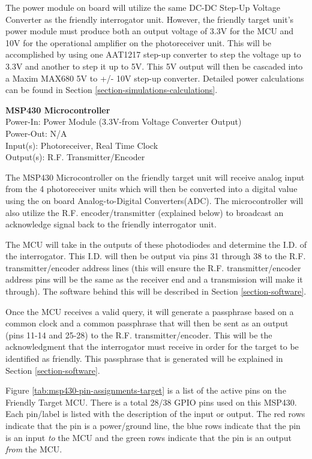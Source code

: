 \documentclass[letterpaper,10pt]{article}
\begin{document}
\begin{spacing}{1.15}
The power module on board will utilize the same DC-DC Step-Up Voltage Converter as the friendly interrogator unit. However, the friendly target unit's power module must produce both an output voltage of 3.3V for the MCU and 10V for the operational amplifier on the photoreceiver unit. This will be accomplished by using one AAT1217 step-up converter to step the voltage up to 3.3V and another to step it up to 5V. This 5V output will then be cascaded into a Maxim MAX680 5V to +/- 10V step-up converter. Detailed power calculations can be found in Section \ref{section-simulations-calculations}.

\normalsize\textbf{MSP430 Microcontroller} \\
Power-In: Power Module (3.3V-from Voltage Converter Output)\\
Power-Out: N/A \\
Input(s): Photoreceiver, Real Time Clock\\
Output(s): R.F. Transmitter/Encoder

The MSP430 Microcontroller on the friendly target unit will receive analog input from the 4 photoreceiver units which will then be converted into a digital value using the on board Analog-to-Digital Converters(ADC). The microcontroller will also utilize the R.F. encoder/transmitter (explained below) to broadcast an acknowledge signal back to the friendly interrogator unit.

The MCU will take in the outputs of these photodiodes and determine the I.D. of the interrogator. This I.D. will then be output via pins 31 through 38 to the R.F. transmitter/encoder address lines (this will ensure the R.F. transmitter/encoder address pins will be the same as the receiver end and a transmission will make it through). The software behind this will be described in Section \ref{section-software}.

Once the MCU receives a valid query, it will generate a passphrase based on a common clock and a common passphrase that will then be sent as an output (pins 11-14 and 25-28) to the R.F. transmitter/encoder. This will be the acknowledgment that the interrogator must receive in order for the target to be identified as friendly. This passphrase that is generated will be explained in Section \ref{section-software}.

Figure \ref{tab:msp430-pin-assignments-target} is a list of the active pins on the Friendly Target MCU. There is a total 28/38 GPIO pins used on this MSP430. Each pin/label is listed with the description of the input or output. The red rows indicate that the pin is a power/ground line, the blue rows indicate that the pin is an input \textit{to} the MCU and the green rows indicate that the pin is an output \textit{from} the MCU.


\end{spacing}
\end{document}
